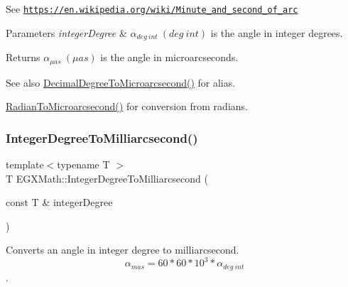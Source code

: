 See \href{https://en.wikipedia.org/wiki/Minute_and_second_of_arc}{\tt https\+://en.\+wikipedia.\+org/wiki/\+Minute\+\_\+and\+\_\+second\+\_\+of\+\_\+arc} 
\begin{DoxyParams}{Parameters}
{\em integer\+Degree} & $\alpha_{deg\ int}\ (deg\ int)$ is the angle in integer degrees. \\
\hline
\end{DoxyParams}
\begin{DoxyReturn}{Returns}
$\alpha_{\mu as}\ (\mu as)$ is the angle in microarcseconds. 
\end{DoxyReturn}
\begin{DoxySeeAlso}{See also}
\mbox{\hyperlink{group___e_g_x_math-_angle_conversions-_decimal_degree_ga6fa88456069907fd24716fa575517571}{Decimal\+Degree\+To\+Microarcsecond()}} for alias. 

\mbox{\hyperlink{group___e_g_x_math-_angle_conversions-_radian_ga3a515ca2838a305fa40750763f546a86}{Radian\+To\+Microarcsecond()}} for conversion from radians. 
\end{DoxySeeAlso}
\mbox{\label{group___e_g_x_math-_angle_conversions-_integer_degree_gadc43f22e832cd8fcf16b7bd2269ae348}} 
\subsubsection{\texorpdfstring{Integer\+Degree\+To\+Milliarcsecond()}{IntegerDegreeToMilliarcsecond()}}
{\footnotesize\ttfamily template$<$typename T $>$ \\
T E\+G\+X\+Math\+::\+Integer\+Degree\+To\+Milliarcsecond (\begin{DoxyParamCaption}\item[{const T \&}]{integer\+Degree }\end{DoxyParamCaption})}



Converts an angle in integer degree to milliarcsecond. \[\alpha_{mas}=60 * 60 * 10^3 * \alpha_{deg\ int} \]. 


